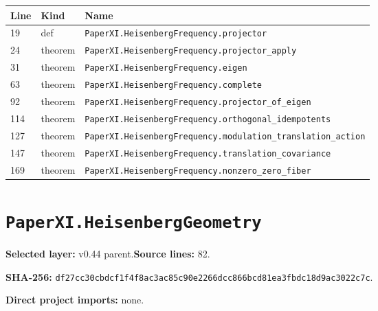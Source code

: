 \documentclass[10pt,oneside]{book}
\begin{document}
\begin{longtable}{@{}p{}p{}p{}@{}}\toprule Line&Kind&Name\\\midrule\endhead

19&def&\nolinkurl{PaperXI.HeisenbergFrequency.projector}\\

24&theorem&\nolinkurl{PaperXI.HeisenbergFrequency.projector_apply}\\

31&theorem&\nolinkurl{PaperXI.HeisenbergFrequency.eigen}\\

63&theorem&\nolinkurl{PaperXI.HeisenbergFrequency.complete}\\

92&theorem&\nolinkurl{PaperXI.HeisenbergFrequency.projector_of_eigen}\\

114&theorem&\nolinkurl{PaperXI.HeisenbergFrequency.orthogonal_idempotents}\\

127&theorem&\nolinkurl{PaperXI.HeisenbergFrequency.modulation_translation_action}\\

147&theorem&\nolinkurl{PaperXI.HeisenbergFrequency.translation_covariance}\\

169&theorem&\nolinkurl{PaperXI.HeisenbergFrequency.nonzero_zero_fiber}\\

\bottomrule\end{longtable}

\section{\texorpdfstring{\nolinkurl{PaperXI.HeisenbergGeometry}}{PaperXI.HeisenbergGeometry}}\label{module:PaperXI.HeisenbergGeometry}

\textbf{Selected layer:} v0.44 parent.\quad\textbf{Source lines:} 82.\par\textbf{SHA-256:} {\scriptsize\nolinkurl{df27cc30cbdcf1f4f8ac3ac85c90e2266dcc866bcd81ea3fbdc18d9ac3022c7c}}.


\textbf{Direct project imports:} none.
\end{document}
